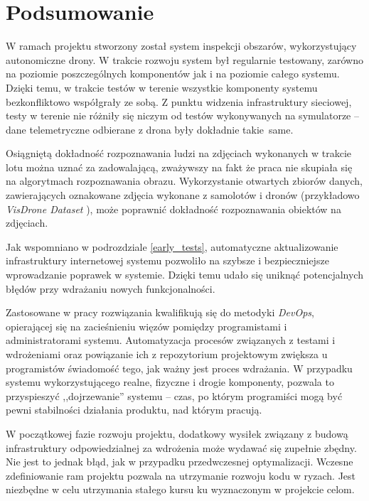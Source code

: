 \chapter{Podsumowanie}

W ramach projektu stworzony został system inspekcji obszarów, wykorzystujący autonomiczne drony.
W trakcie rozwoju system był regularnie testowany, zarówno na poziomie poszczególnych komponentów
jak i na poziomie całego systemu. Dzięki temu, w trakcie testów w terenie wszystkie
komponenty systemu bezkonfliktowo współgrały
ze sobą. Z punktu widzenia infrastruktury sieciowej,
testy w terenie nie różniły się niczym od testów wykonywanych na symulatorze --
dane telemetryczne odbierane z drona były dokładnie takie~same.

Osiągniętą dokładność rozpoznawania ludzi na zdjęciach wykonanych w trakcie lotu
można uznać za zadowalającą, zważywszy na fakt że praca nie skupiała się na
algorytmach rozpoznawania obrazu. Wykorzystanie otwartych zbiorów danych, zawierających
oznakowane zdjęcia wykonane z samolotów i dronów (przykładowo \textit{VisDrone Dataset} \cite{visdrone}),
może poprawnić dokładność rozpoznawania obiektów na zdjęciach.

Jak wspomniano w podrozdziale \ref{early_tests}, automatyczne aktualizowanie infrastruktury
internetowej systemu pozwoliło na szybsze i bezpieczniejsze wprowadzanie poprawek w systemie.
Dzięki temu udało się uniknąć potencjalnych błędów przy wdrażaniu nowych funkcjonalności.

Zastosowane w pracy rozwiązania kwalifikują się do metodyki \textit{DevOps}, opierającej
się na zacieśnieniu więzów pomiędzy programistami i administratorami systemu.
Automatyzacja procesów związanych z testami i wdrożeniami oraz powiązanie ich
z repozytorium projektowym zwiększa u programistów świadomość tego, jak ważny jest proces wdrażania.
W przypadku systemu wykorzystującego realne, fizyczne i drogie komponenty, pozwala to 
przyspieszyć ,,dojrzewanie'' systemu -- czas, po którym programiści mogą być pewni stabilności
działania produktu, nad którym pracują.

W początkowej fazie rozwoju projektu, dodatkowy wysiłek związany z budową infrastruktury
odpowiedzialnej za wdrożenia może wydawać się zupełnie zbędny. Nie jest to jednak 
błąd, jak w przypadku przedwczesnej optymalizacji. Wczesne zdefiniowanie ram projektu
pozwala na utrzymanie rozwoju kodu w ryzach. Jest niezbędne w celu utrzymania
stałego kursu ku wyznaczonym w projekcie celom.

